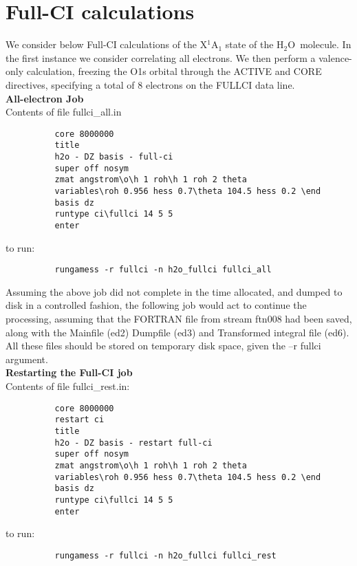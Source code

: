 \documentclass[11pt,fleqn]{article}
\newcommand{\water}{\mbox{H$_{2}$O}}
\begin{document}
\section[Full-CI calculations]{Full-CI calculations}

We consider below  Full-CI calculations of the X$^{1}$A$_{1}$ state
of the \water\ molecule.
In the first instance we consider correlating all electrons.
We then perform a valence-only calculation, freezing the O1s
orbital through the ACTIVE and CORE directives, specifying 
a total of 8 electrons on the FULLCI data line.\\

{\bf All-electron Job}\\

Contents of file fullci\_all.in
{
\footnotesize
\begin{verbatim}
          core 8000000
          title
          h2o - DZ basis - full-ci
          super off nosym
          zmat angstrom\o\h 1 roh\h 1 roh 2 theta
          variables\roh 0.956 hess 0.7\theta 104.5 hess 0.2 \end
          basis dz
          runtype ci\fullci 14 5 5
          enter
\end{verbatim}
}
to run:
{
\footnotesize
\begin{verbatim}
          rungamess -r fullci -n h2o_fullci fullci_all
\end{verbatim}
}
Assuming the above job did not complete in the time allocated,
and dumped to disk in a controlled fashion, the following job
would act to continue the processing, assuming that the
FORTRAN file from stream ftn008 had been saved, along with the Mainfile (ed2)
Dumpfile (ed3) and Transformed integral file (ed6). All these files should
be stored on temporary disk space, given the --r fullci argument.\\

{\bf Restarting the Full-CI job}\\

Contents of file fullci\_rest.in:
{
\footnotesize
\begin{verbatim}
          core 8000000
          restart ci
          title
          h2o - DZ basis - restart full-ci
          super off nosym
          zmat angstrom\o\h 1 roh\h 1 roh 2 theta
          variables\roh 0.956 hess 0.7\theta 104.5 hess 0.2 \end
          basis dz
          runtype ci\fullci 14 5 5
          enter
\end{verbatim}
}
to run:
{
\footnotesize
\begin{verbatim}
          rungamess -r fullci -n h2o_fullci fullci_rest
\end{verbatim}
}
\end{document}
